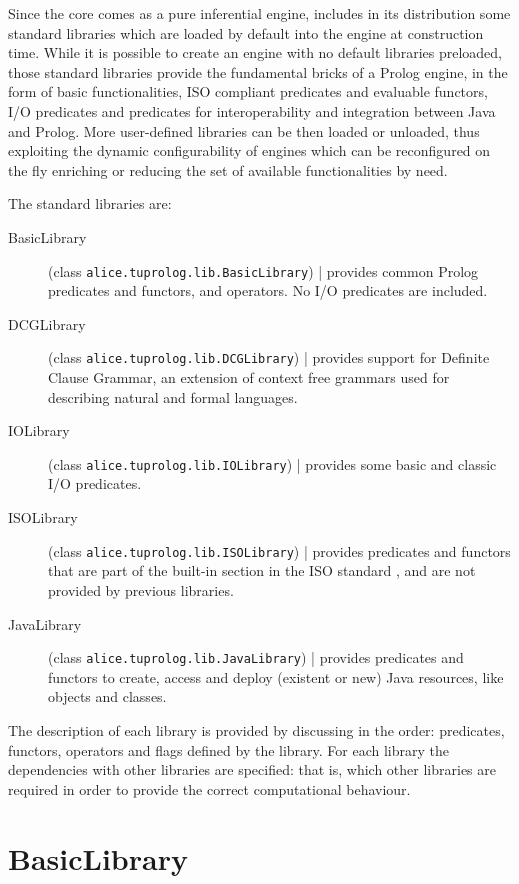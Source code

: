 Since the core comes as a pure inferential engine, \tuprolog{}
includes in its distribution some standard libraries which are
loaded by default into the engine at construction time. While it is
possible to create an engine with no default libraries preloaded,
those standard libraries provide the fundamental bricks of a Prolog
engine, in the form of basic functionalities, ISO compliant
predicates and evaluable functors, I/O predicates and predicates for
interoperability and integration between Java and Prolog.
%
More user-defined libraries can be then loaded or unloaded, thus
exploiting the dynamic configurability of \tuprolog{} engines which
can be reconfigured on the fly enriching or reducing the set of
available functionalities by need.

The standard libraries are:
%
\begin{description}
\item[BasicLibrary] (class \texttt{alice.tuprolog.lib.BasicLibrary}) |
  provides common Prolog predicates and functors, and operators. No
  I/O predicates are included.
%
\item[DCGLibrary] (class \texttt{alice.tuprolog.lib.DCGLibrary}) |
provides support for Definite Clause Grammar, an extension of context
free grammars used for describing natural and formal languages.
%
\item[IOLibrary] (class \texttt{alice.tuprolog.lib.IOLibrary}) |
provides some basic and classic I/O predicates.
%
\item[ISOLibrary] (class \texttt{alice.tuprolog.lib.ISOLibrary}) |
provides predicates and functors that are part of the built-in
section in the ISO standard \cite{iso95}, and are not provided by
previous libraries.
%
\item[JavaLibrary] (class \texttt{alice.tuprolog.lib.JavaLibrary}) |
provides predicates and functors to create, access and deploy
(existent or new) Java resources, like objects and classes.
%
\end{description}
%
\noindent The description of each library is provided by discussing in
the order: predicates, functors, operators and flags defined by the
library.
%
For each library the dependencies with other libraries are specified:
%
that is, which other libraries are required in order to provide the
correct computational behaviour.
%

\section{BasicLibrary}

